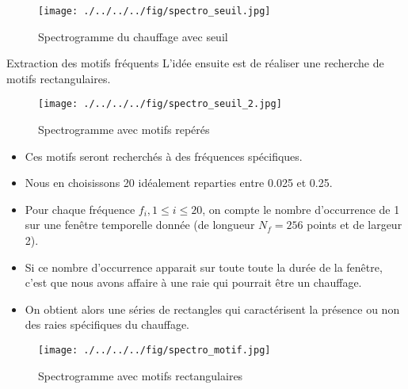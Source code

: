 \documentclass{beamer}
\begin{document}
\begin{frame}
\begin{figure}[!h]
\begin{center}
\texttt{[image: ./../../../fig/spectro\_seuil.jpg]}
\caption{Spectrogramme du chauffage avec seuil}
\label{Figure9}
\end{center}
\end{figure}
\end{frame}

\begin{frame}{Extraction des motifs fréquents}
L'idée ensuite est de réaliser une recherche de motifs rectangulaires.

\begin{figure}[!h]
\begin{center}
\texttt{[image: ./../../../fig/spectro\_seuil\_2.jpg]}
\caption{Spectrogramme avec motifs repérés}
\label{Figure10}
\end{center}
\end{figure}
\end{frame}

\begin{frame}
\begin{itemize}
	\item Ces motifs seront recherchés à des fréquences spécifiques. 			\item Nous en choisissons 20 idéalement reparties entre 0.025 et 0.25.
	\item Pour chaque fréquence $f_i, 1\le i \le 20$, on compte le nombre d'occurrence de 1 sur une fenêtre temporelle donnée (de longueur $N_f = 256$ points et de largeur 2).
	\item Si ce nombre d'occurrence apparait sur toute toute la durée de la fenêtre, c'est que nous avons affaire à une raie qui pourrait être un chauffage.
	\item On obtient alors une séries de rectangles qui caractérisent la présence ou non des raies spécifiques du chauffage.
\end{itemize}
\end{frame}

\begin{frame}
\begin{figure}[!h]
\begin{center}
\texttt{[image: ./../../../fig/spectro\_motif.jpg]}
\caption{Spectrogramme avec motifs rectangulaires}
\label{Figure11}
\end{center}
\end{figure}
\end{frame}
\end{document}
